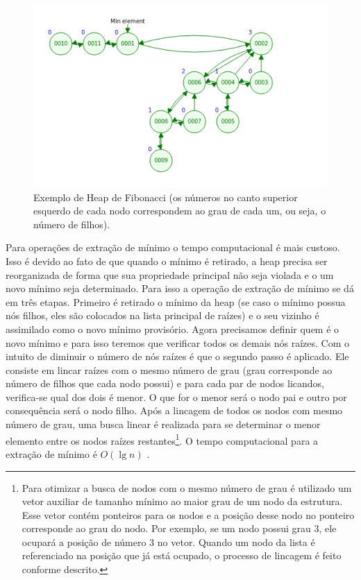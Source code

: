 \begin{figure}[H]
\centering
\includegraphics[width=.54\textwidth]{figuras/fibonacci-heap1} 
\caption{Exemplo de Heap de Fibonacci (os números no canto superior esquerdo de cada nodo correspondem ao grau de cada um, ou seja, o número de filhos).}
\label{fig-dijkstra-heapfibonacci1}
\end{figure}

Para operações de extração de mínimo o tempo computacional é mais custoso. Isso é devido ao fato de que quando o mínimo é retirado, a heap precisa ser reorganizada de forma que sua propriedade principal não seja violada e o um novo mínimo seja determinado. Para isso a operação de extração de mínimo se dá em três etapas. Primeiro é retirado o mínimo da heap (se caso o mínimo possua nós filhos, eles são colocados na lista principal de raízes) e o seu vizinho é assimilado como o novo mínimo provisório. Agora precisamos definir quem é o novo mínimo e para isso teremos que verificar todos os demais nós raízes. Com o intuito de diminuir o número de nós raízes é que o segundo passo é aplicado.  Ele consiste em lincar raízes com o mesmo número de grau (grau corresponde ao número de filhos que cada nodo possui) e para cada par de nodos licandos, verifica-se qual dos dois é menor. O que for o menor será o nodo pai e outro por consequência será o nodo filho. Após a lincagem de todos os nodos com mesmo número de grau, uma busca linear é realizada para se determinar o menor elemento entre os nodos raízes restantes\footnote{Para otimizar a busca de nodos com o mesmo número de grau é utilizado um vetor auxiliar de tamanho mínimo ao maior grau de um nodo da estrutura. Esse vetor contém ponteiros para os nodos e a posição desse nodo no ponteiro corresponde ao grau do nodo. Por exemplo, se um nodo possui grau 3, ele ocupará a posição de número 3 no vetor. Quando um nodo da lista é referenciado na posição que já está ocupado, o processo de lincagem é feito conforme descrito.}. O tempo computacional para a extração de mínimo é $O(\lg n)$ \cite{cormen2009introduction}.


